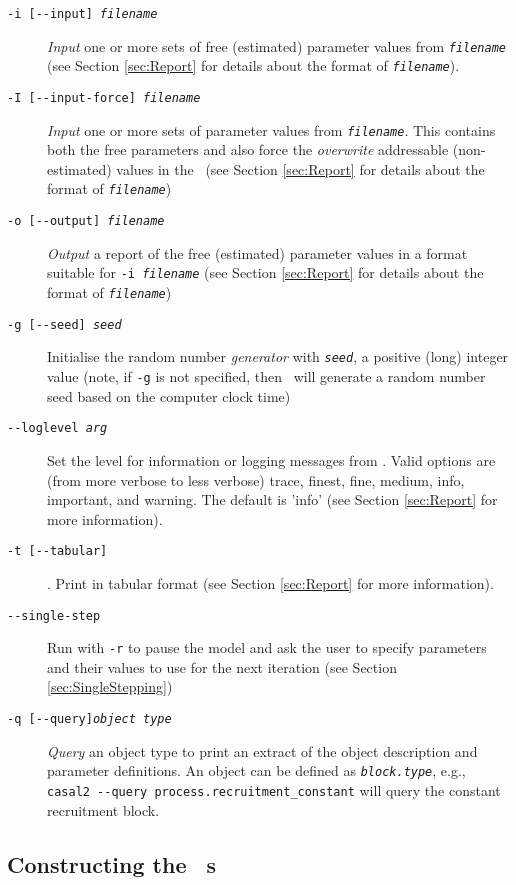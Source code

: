\begin{description}
\item [\texttt{-i [-{}-input] \emph{filename}}] \emph{Input} one or more sets of free (estimated) parameter values from \texttt{\emph{filename}} (see Section \ref{sec:Report} for details about the format of \texttt{\emph{filename}}).
\item [\texttt{-I [-{}-input-force] \emph{filename}}] \emph{Input} one or more sets of parameter values from \texttt{\emph{filename}}. This contains both the free parameters and also force the \emph{overwrite} addressable (non-estimated) values in the \config\ (see Section \ref{sec:Report} for details about the format of \texttt{\emph{filename}})
\item [\texttt{-o [-{}-output] \emph{filename}}] \emph{Output} a report of the free (estimated) parameter values in a format suitable for \texttt{-i \emph{filename}} (see Section \ref{sec:Report} for details about the format of \texttt{\emph{filename}})
\item [\texttt{-g [-{}-seed] \emph{seed}}] Initialise the random number \emph{generator} with \texttt{\emph{seed}}, a positive (long) integer value (note, if \texttt{-g} is not specified, then \CNAME\ will  generate a random number seed based on the computer clock time)
\item [\texttt{-{}-loglevel \emph{arg}}] Set the level for information or logging messages from \CNAME. Valid options are (from more verbose to less verbose) trace, finest, fine, medium, info, important, and warning. The default is 'info' (see Section \ref{sec:Report} for more information).
\item [\texttt{-t [-{}-tabular]}]. Print  in tabular format (see Section \ref{sec:Report} for more information).
\item [\texttt{-{}-single-step}] Run with \texttt{-r} to pause the model and ask the user to specify parameters and their values to use for the next iteration (see Section \ref{sec:SingleStepping})
\item [\texttt{-q [-{}-query]\emph{object type}}] \emph{Query} an object type to print an extract of the object description and parameter definitions.  An object can be defined as \texttt{\emph{block.type}}, e.g., \texttt{casal2 -{}-query process.recruitment\_constant} will query the constant recruitment block.

\end{description}

\subsection{Constructing the \CNAME\ \config s \label{ConstructingConfig}}

